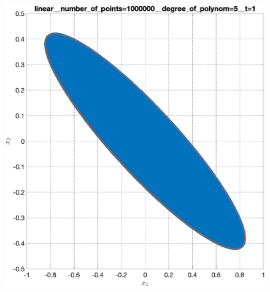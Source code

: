 \documentclass[../main.tex]{subfiles}
\begin{document}
\begin{figure}[ht!]
\begin{minipage}[b]{.3\linewidth}
 	\end{minipage} 
 	\vfill
 	\begin{minipage}[b]{.3\linewidth} 
 		\small
 		\centering 
 		\includegraphics[width=\linewidth]{images/linear__number_of_points=1000000__degree_of_polynom=5__t=1.eps}
 		\label{fig:ap:linearN106k5T1}
 	\end{minipage}
 	\hfill
 	\begin{minipage}[b]{.3\linewidth} 
 		\small
 		\centering

\end{minipage}
\end{figure}
\end{document}
